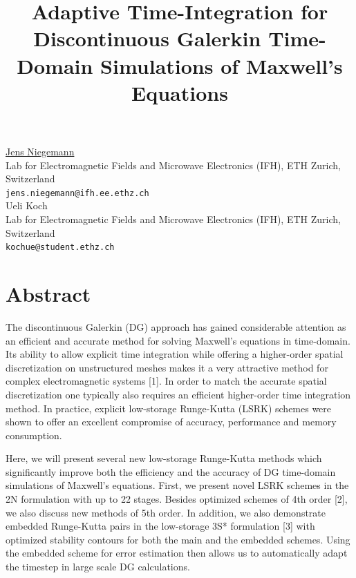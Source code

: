 \documentclass[article, A4, 11pt]{llncs}%
\begin{document}
\title{Adaptive Time-Integration for Discontinuous Galerkin Time-Domain Simulations of Maxwell's Equations}
 \author{} \institute{}
\maketitle
\begin{center}
{\large \underline{Jens Niegemann}}\\
Lab for Electromagnetic Fields and Microwave Electronics (IFH), ETH Zurich, Switzerland\\
{\tt jens.niegemann@ifh.ee.ethz.ch}
\\ \vspace{4mm}
{\large Ueli Koch}\\
Lab for Electromagnetic Fields and Microwave Electronics (IFH), ETH Zurich, Switzerland\\
{\tt kochue@student.ethz.ch}
\end{center}

\section*{Abstract}
The discontinuous Galerkin (DG) approach has gained considerable attention as an efficient and accurate method for solving Maxwell's equations in time-domain. Its ability to allow explicit time integration while offering a higher-order spatial discretization on unstructured meshes makes it a very attractive method for complex electromagnetic systems [1]. In order to match the accurate spatial discretization one typically also requires an efficient higher-order time integration method. In practice, explicit low-storage Runge-Kutta (LSRK) schemes were shown to offer an excellent compromise of accuracy, performance and memory consumption.

Here, we will present several new low-storage Runge-Kutta methods which significantly improve both the efficiency and the accuracy of DG time-domain simulations of Maxwell's equations. First, we present novel LSRK schemes in the 2N formulation with up to 22 stages. Besides optimized schemes of 4th order [2], we also discuss new methods of 5th order. In addition, we also demonstrate embedded Runge-Kutta pairs in the low-storage 3S* formulation [3] with optimized stability contours for both the main and the embedded schemes. Using the embedded scheme for error estimation then allows us to automatically adapt the timestep in large scale DG calculations.
\end{document}
